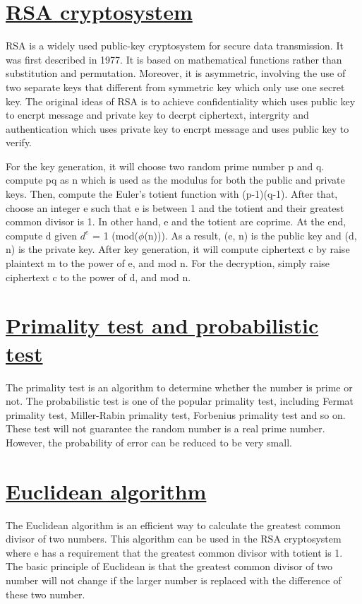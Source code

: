\documentclass[12pt, oneside]{book}
\begin{document}
\section{\underline{RSA cryptosystem}}
RSA is a widely used public-key cryptosystem for secure data transmission. It was first described in 1977. It is based on mathematical functions rather than substitution and permutation. Moreover, it is asymmetric, involving the use of two separate keys that different from symmetric key which only use one secret key. The original ideas of RSA is to achieve confidentiality which uses public key to encrpt message and private key to decrpt ciphertext, intergrity and authentication which uses private key to encrpt message and uses public key to verify.\par
For the key generation, it will choose two random prime number p and q. compute pq as n which is used as the modulus for both the public and private keys. Then, compute the Euler’s totient function with (p-1)(q-1). After that, choose an integer e such that e is between 1 and the totient and their greatest common divisor is 1. In other hand, e and the totient are coprime. At the end, compute d given ${d^e}$ = 1 (mod($\phi$(n))). As a result, (e, n) is the public key and (d, n) is the private key. After key generation, it will compute ciphertext c by raise plaintext m to the power of e, and mod n. For the decryption, simply raise ciphertext c to the power of d, and mod n.

\section{\underline{Primality test and probabilistic test}}
The primality test \cite{rene2008four} is an algorithm to determine whether the number is prime or not. The probabilistic test is one of the popular primality test, including Fermat primality test, Miller-Rabin primality test, Forbenius primality test and so on. These test will not guarantee the random number is a real prime number. However, the probability of error can be reduced to be very small.

\section{\underline{Euclidean algorithm}}
The Euclidean algorithm is an efficient way to calculate the greatest common divisor of two numbers. This algorithm can be used in the RSA cryptosystem where e has a requirement that the greatest common divisor with totient is 1. The basic principle of Euclidean is that the greatest common divisor of two number will not change if the larger number is replaced with the difference of these two number.
\end{document}

